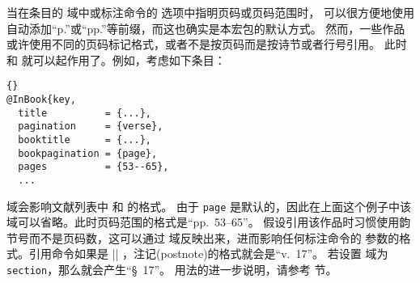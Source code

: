 当在条目的  域中或标注命令的  选项中指明页码或页码范围时，
可以很方便地使用 \biblatex 自动添加“p.”或“pp.”等前缀，而这也确实是本宏包的默认方式。
然而，一些作品或许使用不同的页码标记格式，或者不是按页码而是按诗节或者行号引用。
此时  和  就可以起作用了。例如，考虑如下条目：

\begin{lstlisting}[style=bibtex]{}
@InBook{key,
  title          = {...},
  pagination     = {verse},
  booktitle      = {...},
  bookpagination = {page},
  pages          = {53--65},
  ...
\end{lstlisting}
%
 域会影响文献列表中   和  的格式。
由于 \texttt{page} 是默认的，因此在上面这个例子中该域可以省略。此时页码范围的格式是“pp.~53--65”。
假设引用该作品时习惯使用韵节号而不是页码数，这可以通过  域反映出来，进而影响任何标注命令的  参数的格式。引用命令如果是 |\cite[17]{key}| ，注记(postnote)的格式就会是“v.~17”。
若设置  域为 \texttt{section}，那么就会产生“\S~17”。
用法的进一步说明，请参考  节。

